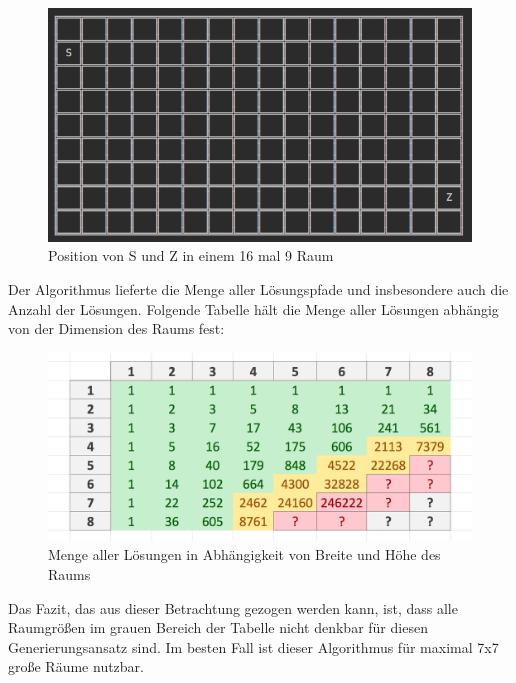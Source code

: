\documentclass[a4paper,10pt,ngerman]{scrartcl}
\begin{document}
			\begin{figure}[h!]
				\begin{center}
					\includegraphics[width=1\textwidth]{SZ.png}
					\caption{Position von S und Z in einem 16 mal 9 Raum}
				\end{center}
			\end{figure}
			\newpage
			
			Der Algorithmus lieferte die Menge aller Lösungspfade und insbesondere auch die Anzahl der Lösungen. Folgende Tabelle hält die Menge aller Lösungen abhängig von der Dimension des Raums fest:
			
			\begin{figure}[h!]
				\begin{center}
					\includegraphics[width=1\textwidth]{Laufzeittabelle.png}
					\caption{Menge aller Lösungen in Abhängigkeit von Breite und Höhe des Raums}
				\end{center}
			\end{figure}
			
			Das Fazit, das aus dieser Betrachtung gezogen werden kann, ist, dass alle Raumgrößen im grauen Bereich der Tabelle nicht denkbar für diesen Generierungsansatz sind. Im besten Fall ist dieser Algorithmus für maximal 7x7 große Räume nutzbar.
		
\end{document}
